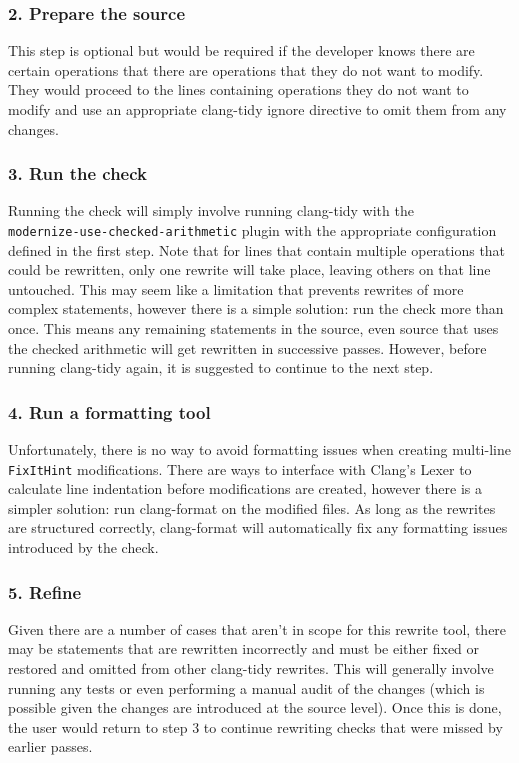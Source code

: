 \subsubsection{2. Prepare the source}

This step is optional but would be required if the developer knows there are certain operations that there are operations that they do not want to modify. They would proceed to the lines containing operations they do not want to modify and use an appropriate clang-tidy ignore directive to omit them from any changes.

\subsubsection{3. Run the check}

Running the check will simply involve running clang-tidy with the \\ \texttt{modernize-use-checked-arithmetic} plugin with the appropriate configuration defined in the first step. Note that for lines that contain multiple operations that could be rewritten, only one rewrite will take place, leaving others on that line untouched. This may seem like a limitation that prevents rewrites of more complex statements, however there is a simple solution: run the check more than once. This means any remaining statements in the source, even source that uses the checked arithmetic will get rewritten in successive passes. However, before running clang-tidy again, it is suggested to continue to the next step.

\subsubsection{4. Run a formatting tool}

Unfortunately, there is no way to avoid formatting issues when creating multi-line \texttt{FixItHint} modifications. There are ways to interface with Clang's Lexer to calculate line indentation before modifications are created, however there is a simpler solution: run clang-format on the modified files. As long as the rewrites are structured correctly, clang-format will automatically fix any formatting issues introduced by the check.

\subsubsection{5. Refine}

Given there are a number of cases that aren't in scope for this rewrite tool, there may be statements that are rewritten incorrectly and must be either fixed or restored and omitted from other clang-tidy rewrites. This will generally involve running any tests or even performing a manual audit of the changes (which is possible given the changes are introduced at the source level). Once this is done, the user would return to step 3 to continue rewriting checks that were missed by earlier passes.

